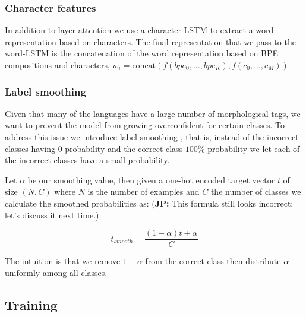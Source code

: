 \documentclass[11pt]{article}
\newcommand\jp[1]{(\textbf{JP:} #1)}
\begin{document}
	\subsubsection{Character features}
    	In addition to layer attention we use a character LSTM to
     extract a word representation based on characters. The final
     representation that we pass to the word-LSTM is the concatenation
     of the word representation based on BPE compositions and
     characters,
     $w_i = \text{concat}(f(bpe_0,...,bpe_K), f(c_0, ..., c_M))$
	
	\subsubsection{Label smoothing}
    	Given that many of the languages have a large number of
     morphological tags, we want to prevent the model from growing
     overconfident for certain classes. To address this issue we
     introduce label smoothing \citep{szegedy2016rethinking}, that is,
     instead of the incorrect classes having 0 probability and the
     correct class $100\%$ probability we let each of the incorrect
     classes have a small probability.


                Let $\alpha$ be our smoothing value, then given a
     one-hot encoded target vector $t$ of size $(N,C)$ where $N$ is
     the number of examples and $C$ the number of classes we calculate
     the smoothed probabilities as:
     \jp{This formula still looks incorrect; let's discuss it next time.}

    \begin{equation}
        t_{smooth} = \frac{(1-\alpha)t + \alpha}{C}
    \end{equation}

            The intuition is that we remove $1-\alpha$ from the
     correct class then distribute $\alpha$ uniformly among all
     classes. 

     \subsection{Training}
\end{document}
